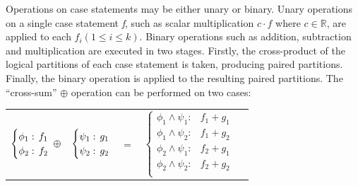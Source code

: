 \documentclass[letterpaper]{article}
\begin{document}
Operations on case statements may be either unary or binary. Unary operations on a single case statement \emph{f}, such as scalar multiplication {\footnotesize$c \cdot f$} where {\footnotesize$ c \in \mathbb{R} $}, are applied to  each {\footnotesize$f_i \left(1 \leq i \leq k\right)$}. Binary operations such as addition, subtraction and multiplication are executed in two stages. Firstly, the cross-product of the logical partitions of each case statement is taken, producing paired partitions. Finally, the binary operation is applied to the resulting paired partitions. The ``cross-sum'' {\footnotesize$\oplus$} operation can be performed on two cases: 
{\footnotesize 
    \begin{center}
        \begin{tabular}{r c c c l}
            $\begin{cases}
            \phi_1: \hspace{-1mm} & \hspace{-1mm} f_1  \\ 
            \phi_2: \hspace{-1mm} & \hspace{-1mm} f_2  \\ 
            \end{cases}$
            $\oplus$
            &
            \hspace{-4mm}
            $\begin{cases}
            \psi_1: \hspace{-1mm} & \hspace{-1mm} g_1  \\ 
            \psi_2: \hspace{-1mm} & \hspace{-1mm} g_2  \\ 
            \end{cases}$
            &
            \hspace{-4mm} 
            $ = $
            &
            \hspace{-4mm}
            $\begin{cases}
            \phi_1 \wedge \psi_1: & f_1 + g_1 \\
            \phi_1 \wedge \psi_2: & f_1 + g_2 \\
            \phi_2 \wedge \psi_1: & f_2 + g_1 \\
            \phi_2 \wedge \psi_2: & f_2 + g_2  \\
            \end{cases}$
        \end{tabular}
    \end{center}
}%
\end{document}
